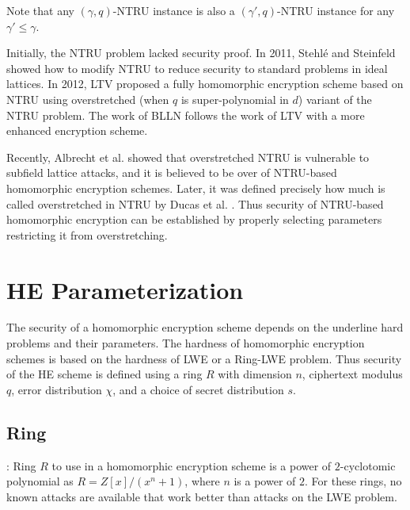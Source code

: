 Note that any $(\gamma, q)$-NTRU instance is also a $(\gamma',q)$-NTRU instance for any $\gamma'\leq\gamma$.



Initially, the NTRU problem lacked security proof. In 2011, Stehl\'{e} and Steinfeld \cite{stehle2011making} showed how to modify NTRU to reduce security to standard problems in ideal lattices. In 2012, LTV \cite{lopez2012fly} proposed a fully homomorphic encryption scheme based on NTRU using overstretched \cite{albrecht2016subfield}(when $q$ is super-polynomial in $d$) variant of the NTRU problem. The work of BLLN \cite{bos2013improved} follows the work of LTV with a more enhanced encryption scheme.

Recently, Albrecht et al. \cite{albrecht2016subfield} showed that overstretched NTRU is vulnerable to subfield lattice attacks, and it is believed to be over of NTRU-based homomorphic encryption schemes. Later, it was defined precisely how much is called overstretched in NTRU by Ducas et al. \cite{ducas2021ntru,bonte2023final}. Thus security of NTRU-based homomorphic encryption can be established by properly selecting parameters restricting it from overstretching.



\section{HE Parameterization}
The security of a homomorphic encryption scheme depends on the underline hard problems and their parameters. The hardness of homomorphic encryption schemes is based on the hardness of LWE or a Ring-LWE problem. Thus security of the HE scheme is defined using a ring $R$ with dimension $n$, ciphertext modulus $q$, error distribution $\chi$, and a choice of secret distribution $s$.
\subsection{Ring} : Ring $R$ to use in a homomorphic encryption scheme is a power of $2$-cyclotomic polynomial as $R=Z[x]/(x^n+1)$, where $n$ is a power of $2$. For these rings, no known attacks are available that work better than attacks on the LWE problem.

